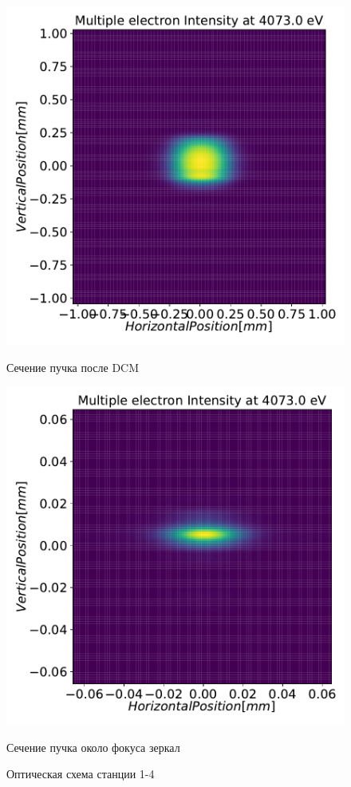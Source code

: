\begin{figure}[h]
\begin{minipage}{0.3\textwidth}
		\includegraphics[width=\textwidth]{pic/3_harm_after_DCM_2d.pdf}
		\caption{Сечение пучка после DCM}
		\label{fig:3_harm_after_DCM_2d}
	\end{minipage} 
	\begin{minipage}{0.3\textwidth}
		\centering
		\includegraphics[width=\textwidth]{pic/3_harm_after_Sph_Mir_2d.pdf}
		\caption{Сечение пучка около фокуса зеркал}
		\label{fig:3_harm_after_Sph_Mir_2d}
	\end{minipage} 
	\caption{Оптическая схема станции 1-4}
\end{figure}
